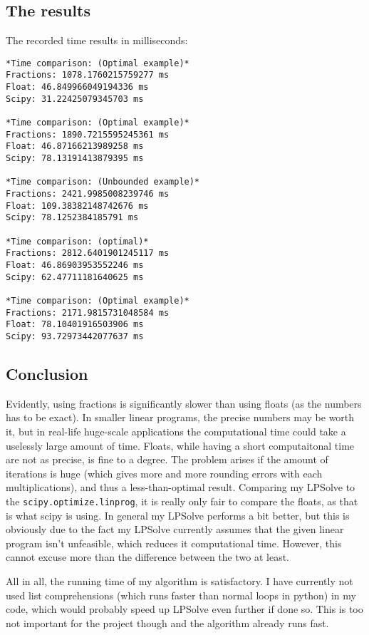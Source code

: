 \documentclass{article}
\begin{document}
\subsection{The results}
\label{sec-1-3}
The recorded time results in milliseconds:
\begin{verbatim}
*Time comparison: (Optimal example)*
Fractions: 1078.1760215759277 ms
Float: 46.849966049194336 ms
Scipy: 31.22425079345703 ms

*Time comparison: (Optimal example)*
Fractions: 1890.7215595245361 ms
Float: 46.87166213989258 ms
Scipy: 78.13191413879395 ms

*Time comparison: (Unbounded example)*
Fractions: 2421.9985008239746 ms
Float: 109.38382148742676 ms
Scipy: 78.1252384185791 ms

*Time comparison: (optimal)*
Fractions: 2812.6401901245117 ms
Float: 46.86903953552246 ms
Scipy: 62.47711181640625 ms

*Time comparison: (Optimal example)*
Fractions: 2171.9815731048584 ms
Float: 78.10401916503906 ms
Scipy: 93.72973442077637 ms
\end{verbatim}

\subsection{Conclusion}
\label{sec-1-4}
Evidently, using fractions is significantly slower than using floats (as the numbers has to be exact). In smaller linear programs, the precise numbers may be worth it, but in real-life huge-scale applications the computational time could take a uselessly large amount of time. Floats, while having a short computaitonal time are not as precise, is fine to a degree. The problem arises if the amount of iterations is huge (which gives more and more rounding errors with each multiplications), and thus a less-than-optimal result. Comparing my LPSolve to the \verb~scipy.optimize.linprog~, it is really only fair to compare the floats, as that is what scipy is using. In general my LPSolve performs a bit better, but this is obviously due to the fact my LPSolve currently assumes that the given linear program isn't unfeasible, which reduces it computational time. However, this cannot excuse more than the difference between the two at least.

All in all, the running time of my algorithm is satisfactory. I have currently not used list comprehensions (which runs faster than normal loops in python) in my code, which would probably speed up LPSolve even further if done so. This is too not important for the project though and the algorithm already runs fast.
\end{document}
